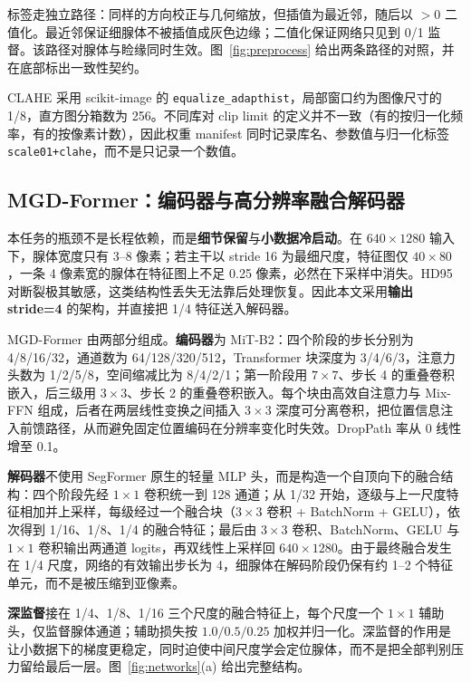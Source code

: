 标签走独立路径：同样的方向校正与几何缩放，但插值为最近邻，随后以 $>0$ 二值化。最近邻保证细腺体不被插值成灰色边缘；二值化保证网络只见到 0/1 监督。该路径对腺体与睑缘同时生效。图~\ref{fig:preprocess} 给出两条路径的对照，并在底部标出一致性契约。



CLAHE 采用 scikit-image 的 \texttt{equalize\_adapthist}，局部窗口约为图像尺寸的 1/8，直方图分箱数为 256。不同库对 clip limit 的定义并不一致（有的按归一化频率，有的按像素计数），因此权重 manifest 同时记录库名、参数值与归一化标签 \texttt{scale01+clahe}，而不是只记录一个数值。

\subsection{MGD-Former：编码器与高分辨率融合解码器}\label{sec:mgdformer}

本任务的瓶颈不是长程依赖，而是\textbf{细节保留}与\textbf{小数据冷启动}。在 $640\times1280$ 输入下，腺体宽度只有 3--8 像素；若主干以 stride 16 为最细尺度，特征图仅 $40\times80$，一条 4 像素宽的腺体在特征图上不足 0.25 像素，必然在下采样中消失。HD95 对断裂极其敏感，这类结构性丢失无法靠后处理恢复。因此本文采用\textbf{输出 stride=4} 的架构，并直接把 1/4 特征送入解码器。

MGD-Former 由两部分组成。\textbf{编码器}为 MiT-B2\cite{segformer}：四个阶段的步长分别为 4/8/16/32，通道数为 64/128/320/512，Transformer 块深度为 3/4/6/3，注意力头数为 1/2/5/8，空间缩减比为 8/4/2/1；第一阶段用 $7\times7$、步长 4 的重叠卷积嵌入，后三级用 $3\times3$、步长 2 的重叠卷积嵌入。每个块由高效自注意力与 Mix-FFN 组成，后者在两层线性变换之间插入 $3\times3$ 深度可分离卷积，把位置信息注入前馈路径，从而避免固定位置编码在分辨率变化时失效。DropPath 率从 0 线性增至 0.1。

\textbf{解码器}不使用 SegFormer 原生的轻量 MLP 头，而是构造一个自顶向下的融合结构：四个阶段先经 $1\times1$ 卷积统一到 128 通道；从 1/32 开始，逐级与上一尺度特征相加并上采样，每级经过一个融合块（$3\times3$ 卷积 + BatchNorm + GELU），依次得到 1/16、1/8、1/4 的融合特征；最后由 $3\times3$ 卷积、BatchNorm、GELU 与 $1\times1$ 卷积输出两通道 logits，再双线性上采样回 $640\times1280$。由于最终融合发生在 1/4 尺度，网络的有效输出步长为 4，细腺体在解码阶段仍保有约 1--2 个特征单元，而不是被压缩到亚像素。

\textbf{深监督}接在 1/4、1/8、1/16 三个尺度的融合特征上，每个尺度一个 $1\times1$ 辅助头，仅监督腺体通道；辅助损失按 $1.0/0.5/0.25$ 加权并归一化。深监督的作用是让小数据下的梯度更稳定，同时迫使中间尺度学会定位腺体，而不是把全部判别压力留给最后一层。图~\ref{fig:networks}(a) 给出完整结构。

